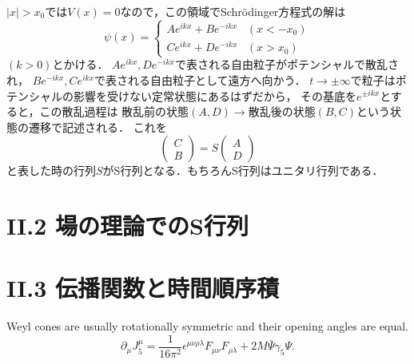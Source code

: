 \documentclass[dvipdfmx,uplatex]{jsarticle}
\numberwithin{theorem}{section}
\numberwithin{reibangou}{section}
\numberwithin{reidaibangou}{section}
\numberwithin{mondaibangou}{section}
\begin{document}
$|x| > x_0$では$V(x)=0$なので，この領域でSchr\"{o}dinger方程式の解は
\begin{equation}
    \psi (x)
    =\begin{cases}
        A e^{ikx} + B e^{-ikx} & (x<-x_0) \\
        C e^{ikx} + D e^{-ikx} & (x>x_0)
    \end{cases}
\end{equation}
$(k>0)$とかける．
$A e^{ikx}, D e^{-ikx}$で表される自由粒子がポテンシャルで散乱され，
$B e^{-ikx}, C e^{ikx}$で表される自由粒子として遠方へ向かう．
$t \to \pm \infty$で粒子はポテンシャルの影響を受けない定常状態にあるはずだから，
その基底を$e^{\pm i k x}$とすると，この散乱過程は
$散乱前の状態(A, D) \to 散乱後の状態(B, C)$という状態の遷移で記述される．
これを
\begin{equation}
    \begin{pmatrix}
        C \\
        B
    \end{pmatrix}
    = S
    \begin{pmatrix}
        A \\
        D
    \end{pmatrix}
\end{equation}
と表した時の行列$S$がS行列となる．もちろんS行列はユニタリ行列である．

\section*{II.2 場の理論でのS行列}


\section*{II.3 伝播関数と時間順序積}
Weyl cones are usually rotationally symmetric and their opening angles are equal.
\begin{equation}
    \partial_\mu J_5^\mu
    = \frac{1}{16\pi^2} \epsilon^{\mu\nu\rho\lambda} F_{\mu\nu} F_{\rho\lambda}
    + 2M \bar{\Psi}\gamma_5 \Psi.
\end{equation} %



\end{document}
